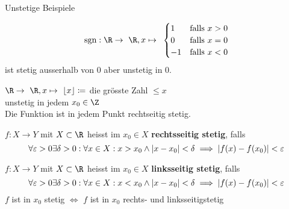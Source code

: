 Unstetige Beispiele\\
\begin{bsp*}
	\[ \sgn: \R \rightarrow \R , x \mapsto \begin{cases}
		1	&\text{falls } x > 0	\\
		0	&\text{falls } x = 0	\\
		-1	&\text{falls } x < 0	
	\end{cases} \]
	ist stetig ausserhalb von $0$ aber unstetig in $0$.
\end{bsp*}
\begin{bsp*}
	$\R \rightarrow \R , x \mapsto \lfloor x \rfloor \coloneqq$ die grösste Zahl $\leq x$\\
	unstetig in jedem $x_0 \in \Z$\\
	Die Funktion ist in jedem Punkt rechtseitig stetig.
\end{bsp*}
\begin{def*}[note = rechts-/linksseitige Stetigkeit , index = Stetigkeit]
	$f: X \rightarrow Y$ mit $X \subset \R$ heisst im $x_0 \in X$ \textbf{rechtsseitig stetig}, falls\\
	\[ \forall \epsilon > 0 \exists \delta > 0 : \forall x \in X : x > x_0 \wedge \abs{x-x_0} < \delta \implies \abs{f(x)-f(x_0)} < \epsilon \]
	
	$f: X \rightarrow Y$ mit $X \subset \R$ heisst im $x_0 \in X$ \textbf{linksseitig stetig}, falls\\
	\[ \forall \epsilon > 0 \exists \delta > 0 : \forall x \in X : x < x_0 \wedge \abs{x-x_0} < \delta \implies \abs{f(x)-f(x_0)} < \epsilon \]	
	$f$ ist in $x_0$ stetig $\iff$ $f$ ist in $x_0$ rechts- und linksseitigstetig
\end{def*}

